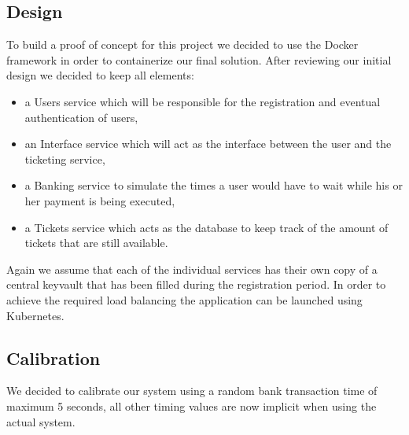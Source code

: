 \documentclass[conference]{IEEEtran}
\begin{document}
\subsection{Design}
To build a proof of concept for this project we decided to use the Docker framework in order to containerize our final solution. After reviewing our initial design we decided to keep all elements:
\begin{itemize}
	\item a Users service which will be responsible for the registration and eventual authentication of users,
	\item an Interface service which will act as the interface between the user and the ticketing service,
	\item a Banking service to simulate the times a user would have to wait while his or her payment is being executed,
	\item a Tickets service which acts as the database to keep track of the amount of tickets that are still available.
\end{itemize}
Again we assume that each of the individual services has their own copy of a central keyvault that has been filled during the registration period. In order to achieve the required load balancing the application can be launched using Kubernetes.\\

\subsection{Calibration}
We decided to calibrate our system using a random bank transaction time of maximum 5 seconds, all other timing values are now implicit when using the actual system.
\end{document}
